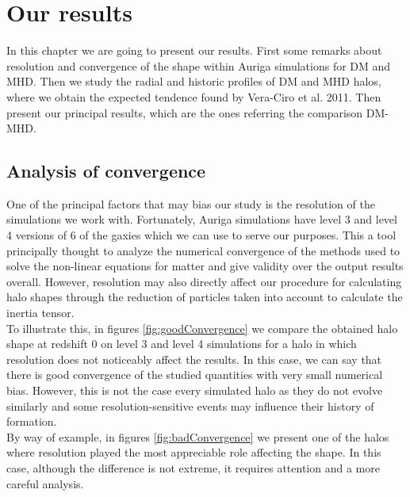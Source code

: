 \chapter{Our results}

In this chapter we are going to present our results. First some remarks about resolution and convergence of the shape within Auriga simulations for DM and MHD. Then we study the radial and historic profiles of DM and MHD halos, where we obtain the expected tendence found by Vera-Ciro et al. 2011. Then present our principal results, which are the ones referring the comparison DM-MHD.

\section{Analysis of convergence}
One of the principal factors that may bias our study is the resolution of the simulations we work with. Fortunately, Auriga simulations have level 3 and level 4 versions of 6 of the gaxies which we can use to serve our purposes. This a tool principally thought to analyze the numerical convergence of the methods used to solve the non-linear equations for matter and give validity over the output results overall. However, resolution may also directly affect our procedure for calculating halo shapes through the reduction of particles taken into account to calculate the inertia tensor.\\

To illustrate this, in figures \ref{fig:goodConvergence} we compare the obtained halo shape at redshift 0 on level 3 and level 4 simulations for a halo in which resolution does not noticeably affect the results. In this case, we can say that there is good convergence of the studied quantities with very small numerical bias. However, this is not the case every simulated halo as they do not evolve similarly and some resolution-sensitive events may influence their history of formation.\\

 By way of example, in figures \ref{fig:badConvergence} we present one of the halos where resolution played the most appreciable role affecting the shape. In this case, although the difference is not extreme, it requires attention and a more careful analysis.\\

